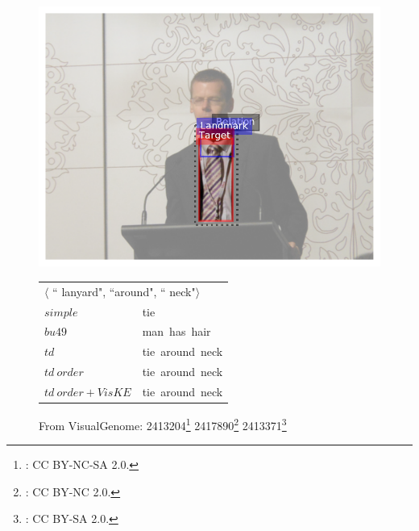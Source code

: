\begin{figure}[hb]
\begin{minipage}{\textwidth}
\begin{minipage}{0.3\textwidth}
			\includegraphics[scale=0.25]{studies/inlg2019/figures/2413371_lanyard_around_neck.pdf}
		\end{minipage}%
		\begin{minipage}{0.7\textwidth}%
			\begin{tabular}{|ll}
				\multicolumn{2}{|l}{$\langle$ ``{\color{red} lanyard}", ``around", ``{\color{blue} neck}"$\rangle$} \\
				$simple$         & {tie} \\
				$bu49$           & {man~has~hair} \\
				$td$             & {tie~around~neck} \\
				$td~order$       & {tie~around~neck} \\
				$td~order+VisKE$ & {tie~around~neck} \\
			\end{tabular}	
		\end{minipage}%
		\caption{From VisualGenome:
			2413204\protect\footnote{\citet{vg2413204}: CC BY-NC-SA 2.0.}
			2417890\protect\footnote{\citet{vg2417890}: CC BY-NC 2.0.}
			2413371\protect\footnote{\citet{vg2413371}: CC BY-SA 2.0.}
		}\label{inlg2019:fig:data_example2a}
	\end{minipage}%
\end{figure}


\clearpage


